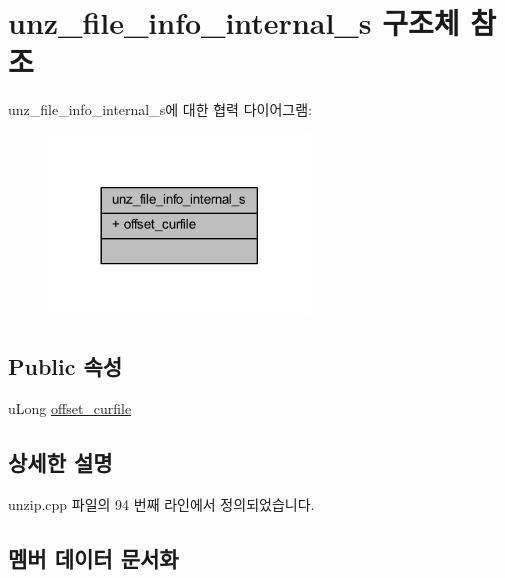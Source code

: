 \hypertarget{structunz__file__info__internal__s}{}\section{unz\+\_\+file\+\_\+info\+\_\+internal\+\_\+s 구조체 참조}
\label{structunz__file__info__internal__s}


unz\+\_\+file\+\_\+info\+\_\+internal\+\_\+s에 대한 협력 다이어그램\+:\nopagebreak
\begin{figure}[H]
\begin{center}
\leavevmode
\includegraphics[width=197pt]{structunz__file__info__internal__s__coll__graph}
\end{center}
\end{figure}
\subsection*{Public 속성}
\begin{DoxyCompactItemize}
\item 
u\+Long \mbox{\hyperlink{structunz__file__info__internal__s_a23d3a1c3584888bdf066d7bfed95f62e}{offset\+\_\+curfile}}
\end{DoxyCompactItemize}


\subsection{상세한 설명}


unzip.\+cpp 파일의 94 번째 라인에서 정의되었습니다.



\subsection{멤버 데이터 문서화}
\mbox{\label{structunz__file__info__internal__s_a23d3a1c3584888bdf066d7bfed95f62e}} 
